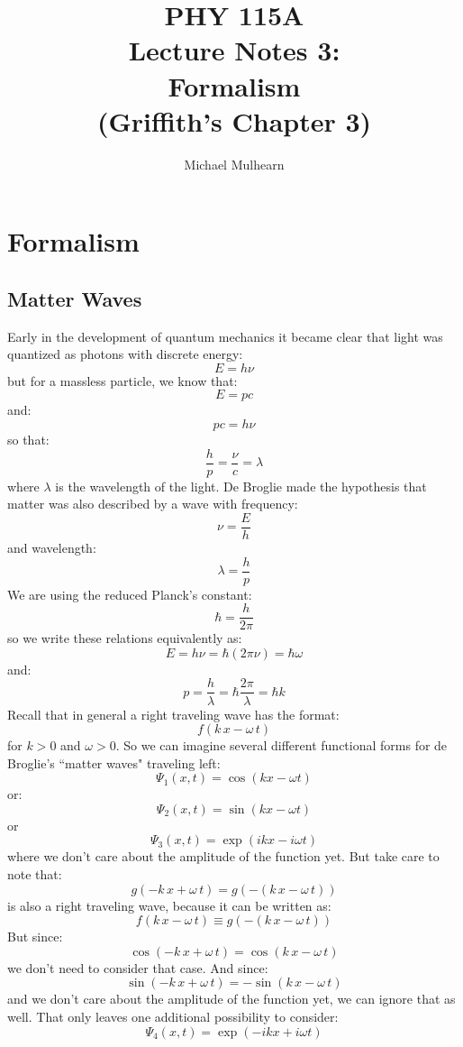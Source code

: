 \documentclass[12pt]{book}
\begin{document}
\newcommand{\ihbar}{\ensuremath{i \hbar}}
\newcommand{\Pss}{\ensuremath{\Psi^*}}
\newcommand{\dPsidt}{\ensuremath{ \frac{\partial \Psi}{\partial t} }}
\newcommand{\dPsidx}{\ensuremath{ \frac{\partial \Psi}{\partial x} }}
\newcommand{\ddPsidx}{\ensuremath{ \frac{\partial^2 \Psi}{\partial x^2} }}
\newcommand{\dPssdt}{\ensuremath{ \frac{\partial \Psi^*}{\partial t} }}
\newcommand{\dPssdx}{\ensuremath{ \frac{\partial \Psi^*}{\partial x} }}
\newcommand{\ddPssdx}{\ensuremath{ \frac{\partial^2 \Psi^*}{\partial x^2} }}

\newcommand{\dphidt}{\ensuremath{ \frac{d \phi}{dt} }}
\newcommand{\dpsidx}{\ensuremath{ \frac{d \psi}{dx} }}
\newcommand{\ddpsidx}{\ensuremath{ \frac{d^2 \psi}{dx^2} }}


\title{PHY 115A \\ Lecture Notes 3: \\ 
Formalism \\
(Griffith's Chapter 3)}
\author{Michael Mulhearn}

\maketitle

\setcounter{chapter}{2}
\chapter{Formalism}

\section{Matter Waves}

Early in the development of quantum mechanics it became clear that light was quantized as photons with discrete energy:
$$E=h\nu$$
but for a massless particle, we know that:
$$E = pc$$
and:
$$pc = h\nu$$ 
so that:
$$\frac{h}{p} = \frac{\nu}{c} = \lambda$$
where $\lambda$ is the wavelength of the light.  De Broglie made the hypothesis that matter was also described by a wave with frequency:
$$\nu = \frac{E}{h}$$
and wavelength:
$$\lambda = \frac{h}{p}$$
We are using the reduced Planck's constant:
$$\hbar = \frac{h}{2\pi}$$
so we write these relations equivalently as:
$$E = h\nu = \hbar (2\pi \nu) = \hbar \omega$$
and:
$$p = \frac{h}{\lambda} = \hbar \frac{2\pi}{\lambda} = \hbar k$$
Recall that in general a right traveling wave has the format:
$$f(k\,x-\omega \, t)$$
for $k>0$ and $\omega>0$.  So we can imagine several different functional forms for de Broglie's ``matter waves" traveling left:
$$\Psi_1(x,t) = \cos(kx - \omega t)$$
or:
$$\Psi_2(x,t) = \sin(kx - \omega t)$$
or
$$\Psi_3(x,t) = \exp(ikx - i\omega t)$$
where we don't care about the amplitude of the function yet.  But take care to note that:
$$g(-k\,x+\omega \, t) = g(-(k\,x-\omega \, t))$$
is also a right traveling wave, because it can be written as:
$$f(k\,x-\omega \, t) \equiv g(-(k\,x-\omega \, t))$$
But since:
$$\cos(-k\,x+\omega \, t) = \cos(k\,x-\omega \, t)$$
we don't need to consider that case.  And since:
$$\sin(-k\,x+\omega \, t) = -\sin(k\,x-\omega \, t)$$
and we don't care about the amplitude of the function yet, we can ignore that as well.  That only leaves one additional possibility to consider:
$$\Psi_4(x,t) = \exp(-ikx + i\omega t)$$
\end{document}

